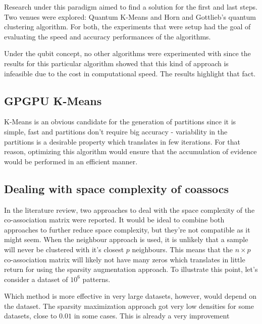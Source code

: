 Research under this paradigm aimed to find a solution for the first and last steps. Two venues were explored: Quantum K-Means and Horn and Gottlieb's quantum clustering algorithm.
For both, the experiments that were setup had the goal of evaluating the speed and accuracy performances of the algorithms.

Under the qubit concept, no other algorithms were experimented with since the results for this particular algorithm showed that this kind of approach is infeasible due to the cost in computational speed. The results highlight that fact.



\subsection{GPGPU K-Means}
K-Means is an obvious candidate for the generation of partitions since it is simple, fast and partitions don't require big accuracy - variability in the partitions is a desirable property which translates in few iterations. For that reason, optimizing this algorithm would ensure that the accumulation of evidence would be performed in an efficient manner.



\subsection{Dealing with space complexity of coassocs}
In the literature review, two approaches to deal with the space complexity of the co-association matrix were reported. It would be ideal to combine both approaches to further reduce space complexity, but they're not compatible as it might seem. When the neighbour approach is used, it is unlikely that a sample will never be clustered with it's closest $p$ neighbours. This means that the $n \times p$ co-association matrix will likely not have many zeros which translates in little return for using the sparsity augmentation approach. To illustrate this point, let's consider a dataset of $10^6$ patterns. 


Which method is more effective in very large datasets, however, would depend on the dataset. The sparsity maximization approach got very low densities for some datasets, close to $0.01$ in some cases. This is already a very improvement
